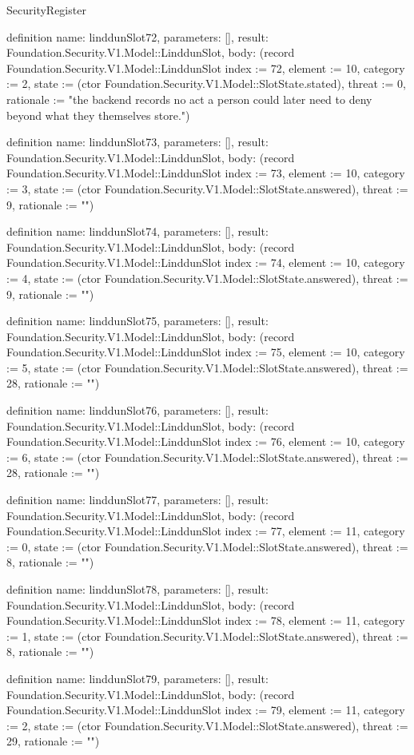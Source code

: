 \begin{lexlean}{SecurityRegister}
\begin{semanticmodule}
definition{
  name: linddunSlot72,
  parameters: [],
  result: Foundation.Security.V1.Model::LinddunSlot,
  body: (record Foundation.Security.V1.Model::LinddunSlot {index := 72, element := 10, category := 2, state := (ctor Foundation.Security.V1.Model::SlotState.stated), threat := 0, rationale := "the backend records no act a person could later need to deny beyond what they themselves store."})
}

definition{
  name: linddunSlot73,
  parameters: [],
  result: Foundation.Security.V1.Model::LinddunSlot,
  body: (record Foundation.Security.V1.Model::LinddunSlot {index := 73, element := 10, category := 3, state := (ctor Foundation.Security.V1.Model::SlotState.answered), threat := 9, rationale := ""})
}

definition{
  name: linddunSlot74,
  parameters: [],
  result: Foundation.Security.V1.Model::LinddunSlot,
  body: (record Foundation.Security.V1.Model::LinddunSlot {index := 74, element := 10, category := 4, state := (ctor Foundation.Security.V1.Model::SlotState.answered), threat := 9, rationale := ""})
}

definition{
  name: linddunSlot75,
  parameters: [],
  result: Foundation.Security.V1.Model::LinddunSlot,
  body: (record Foundation.Security.V1.Model::LinddunSlot {index := 75, element := 10, category := 5, state := (ctor Foundation.Security.V1.Model::SlotState.answered), threat := 28, rationale := ""})
}

definition{
  name: linddunSlot76,
  parameters: [],
  result: Foundation.Security.V1.Model::LinddunSlot,
  body: (record Foundation.Security.V1.Model::LinddunSlot {index := 76, element := 10, category := 6, state := (ctor Foundation.Security.V1.Model::SlotState.answered), threat := 28, rationale := ""})
}

definition{
  name: linddunSlot77,
  parameters: [],
  result: Foundation.Security.V1.Model::LinddunSlot,
  body: (record Foundation.Security.V1.Model::LinddunSlot {index := 77, element := 11, category := 0, state := (ctor Foundation.Security.V1.Model::SlotState.answered), threat := 8, rationale := ""})
}

definition{
  name: linddunSlot78,
  parameters: [],
  result: Foundation.Security.V1.Model::LinddunSlot,
  body: (record Foundation.Security.V1.Model::LinddunSlot {index := 78, element := 11, category := 1, state := (ctor Foundation.Security.V1.Model::SlotState.answered), threat := 8, rationale := ""})
}

definition{
  name: linddunSlot79,
  parameters: [],
  result: Foundation.Security.V1.Model::LinddunSlot,
  body: (record Foundation.Security.V1.Model::LinddunSlot {index := 79, element := 11, category := 2, state := (ctor Foundation.Security.V1.Model::SlotState.answered), threat := 29, rationale := ""})
}


\end{semanticmodule}
\end{lexlean}
